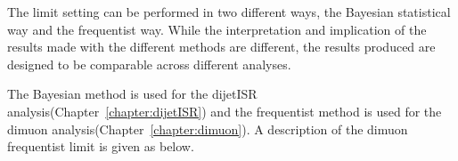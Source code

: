 


The limit setting can be performed in two different ways, the Bayesian statistical way and the frequentist way. While the interpretation and implication of the results made with the different methods are different, the results produced are designed to be comparable across different analyses. 

The Bayesian method is used for the dijetISR analysis(Chapter~\ref{chapter:dijetISR}) and the frequentist method is used for the dimuon analysis(Chapter~\ref{chapter:dimuon}). A description of the dimuon frequentist limit is given as below. 

%



